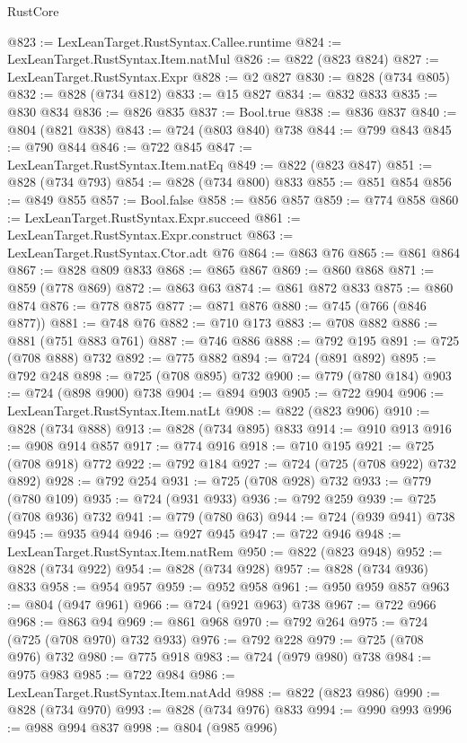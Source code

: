 \begin{lexlean}{RustCore}
\begin{coremodule}
@823 := LexLeanTarget.RustSyntax.Callee.runtime
@824 := LexLeanTarget.RustSyntax.Item.natMul
@826 := @822 (@823 @824)
@827 := LexLeanTarget.RustSyntax.Expr
@828 := @2 @827
@830 := @828 (@734 @805)
@832 := @828 (@734 @812)
@833 := @15 @827
@834 := @832 @833
@835 := @830 @834
@836 := @826 @835
@837 := Bool.true
@838 := @836 @837
@840 := @804 (@821 @838)
@843 := @724 (@803 @840) @738
@844 := @799 @843
@845 := @790 @844
@846 := @722 @845
@847 := LexLeanTarget.RustSyntax.Item.natEq
@849 := @822 (@823 @847)
@851 := @828 (@734 @793)
@854 := @828 (@734 @800) @833
@855 := @851 @854
@856 := @849 @855
@857 := Bool.false
@858 := @856 @857
@859 := @774 @858
@860 := LexLeanTarget.RustSyntax.Expr.succeed
@861 := LexLeanTarget.RustSyntax.Expr.construct
@863 := LexLeanTarget.RustSyntax.Ctor.adt @76
@864 := @863 @76
@865 := @861 @864
@867 := @828 @809 @833
@868 := @865 @867
@869 := @860 @868
@871 := @859 (@778 @869)
@872 := @863 @63
@874 := @861 @872 @833
@875 := @860 @874
@876 := @778 @875
@877 := @871 @876
@880 := @745 (@766 (@846 @877))
@881 := @748 @76
@882 := @710 @173
@883 := @708 @882
@886 := @881 (@751 @883 @761)
@887 := @746 @886
@888 := @792 @195
@891 := @725 (@708 @888) @732
@892 := @775 @882
@894 := @724 (@891 @892)
@895 := @792 @248
@898 := @725 (@708 @895) @732
@900 := @779 (@780 @184)
@903 := @724 (@898 @900) @738
@904 := @894 @903
@905 := @722 @904
@906 := LexLeanTarget.RustSyntax.Item.natLt
@908 := @822 (@823 @906)
@910 := @828 (@734 @888)
@913 := @828 (@734 @895) @833
@914 := @910 @913
@916 := @908 @914 @857
@917 := @774 @916
@918 := @710 @195
@921 := @725 (@708 @918) @772
@922 := @792 @184
@927 := @724 (@725 (@708 @922) @732 @892)
@928 := @792 @254
@931 := @725 (@708 @928) @732
@933 := @779 (@780 @109)
@935 := @724 (@931 @933)
@936 := @792 @259
@939 := @725 (@708 @936) @732
@941 := @779 (@780 @63)
@944 := @724 (@939 @941) @738
@945 := @935 @944
@946 := @927 @945
@947 := @722 @946
@948 := LexLeanTarget.RustSyntax.Item.natRem
@950 := @822 (@823 @948)
@952 := @828 (@734 @922)
@954 := @828 (@734 @928)
@957 := @828 (@734 @936) @833
@958 := @954 @957
@959 := @952 @958
@961 := @950 @959 @857
@963 := @804 (@947 @961)
@966 := @724 (@921 @963) @738
@967 := @722 @966
@968 := @863 @94
@969 := @861 @968
@970 := @792 @264
@975 := @724 (@725 (@708 @970) @732 @933)
@976 := @792 @228
@979 := @725 (@708 @976) @732
@980 := @775 @918
@983 := @724 (@979 @980) @738
@984 := @975 @983
@985 := @722 @984
@986 := LexLeanTarget.RustSyntax.Item.natAdd
@988 := @822 (@823 @986)
@990 := @828 (@734 @970)
@993 := @828 (@734 @976) @833
@994 := @990 @993
@996 := @988 @994 @837
@998 := @804 (@985 @996)

\end{coremodule}
\end{lexlean}

